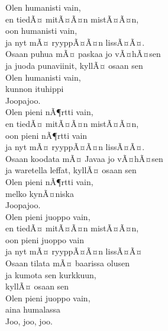 \documentclass[a4paper,12pt,oneside]{lauluvihko}
\begin{document}
   \kansilehti %

   \newpage %

   \tableofcontents %

   \newpage %

\begin{multicols}{2}

Olen humanisti vain,\\ 
en tiedÃ¤ mitÃ¤Ã¤n mistÃ¤Ã¤n,\\ 
oon humanisti vain,\\ 
ja nyt mÃ¤ ryyppÃ¤Ã¤n lissÃ¤Ã¤.\\ 
Osaan puhua mÃ¤ paskaa jo vÃ¤hÃ¤sen\\ 
ja juoda punaviinit, kyllÃ¤ osaan sen\\ 
Olen humanisti vain,\\ 
kunnon ituhippi\\ 
Joopajoo.\\ 

Olen pieni nÃ¶rtti vain,\\ 
en tiedÃ¤ mitÃ¤Ã¤n mistÃ¤Ã¤n,\\ 
oon pieni nÃ¶rtti vain\\ 
ja nyt mÃ¤ ryyppÃ¤Ã¤n lissÃ¤Ã¤.\\ 
Osaan koodata mÃ¤ Javaa jo vÃ¤hÃ¤sen\\ 
ja waretella leffat, kyllÃ¤ osaan sen\\ 
Olen pieni nÃ¶rtti vain,\\ 
melko kynÃ¤niska\\ 
Joopajoo.\\ 

Olen pieni juoppo vain,\\ 
en tiedÃ¤ mitÃ¤Ã¤n mistÃ¤Ã¤n, \\ 
oon pieni juoppo vain\\ 
ja nyt mÃ¤ ryyppÃ¤Ã¤n lissÃ¤Ã¤\\ 
Osaan tilata mÃ¤ baarissa olusen\\ 
ja kumota sen kurkkuun,\\ 
kyllÃ¤ osaan sen\\ 
Olen pieni juoppo vain,\\ 
aina humalassa\\ 
Joo, joo, joo.\\ 


\end{multicols}
\end{document}
